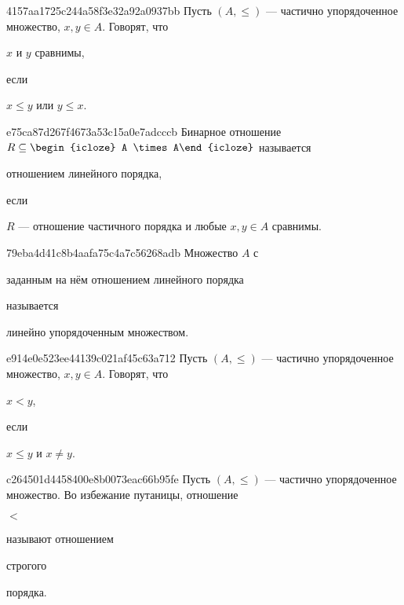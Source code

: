 \begin{note}{4157aa1725c244a58f3e32a92a0937bb}
    Пусть \({ (A, \leqslant) }\) --- частично упорядоченное множество, \({ x, y \in A }\).
    Говорят, что \begin{icloze}{2}\({ x }\) и \({ y }\) сравнимы,\end{icloze} если \begin{icloze}{1}\({ x \leqslant y }\) или \({ y \leqslant x }\).\end{icloze}
\end{note}

\begin{note}{e75ca87d267f4673a53c15a0e7adcccb}
    Бинарное отношение \({ R \subseteq \begin{icloze}{3}A \times A\end{icloze} }\) называется \begin{icloze}{2}отношением линейного порядка,\end{icloze} если \begin{icloze}{1}\({ R }\) --- отношение частичного порядка и любые \({ x, y \in A }\) сравнимы.\end{icloze}
\end{note}

\begin{note}{79eba4d41c8b4aafa75c4a7c56268adb}
    Множество \({ A }\) с \begin{icloze}{2}заданным на нём отношением линейного порядка\end{icloze} называется \begin{icloze}{1}линейно упорядоченным множеством.\end{icloze}
\end{note}

\begin{note}{e914e0e523ee44139c021af45c63a712}
    Пусть \({ (A, \leqslant) }\) --- частично упорядоченное множество, \({ x, y \in A }\).
    Говорят, что \begin{icloze}{2}\({ x < y }\),\end{icloze} если \begin{icloze}{1}\({ x \leqslant y }\) и \({ x \neq y }\).\end{icloze}
\end{note}

\begin{note}{c264501d4458400e8b0073eac66b95fe}
    Пусть \({ (A, \leqslant) }\) --- частично упорядоченное множество.
    Во избежание путаницы, отношение \begin{icloze}{2}\({ < }\)\end{icloze} называют отношением \begin{icloze}{1}строгого\end{icloze} порядка.
\end{note}

